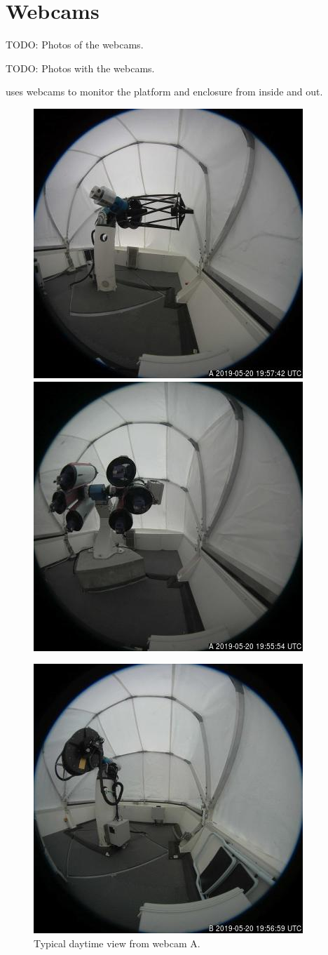 \chapter{Webcams}
\label{chapter:webcams}

TODO: Photos of the webcams.

TODO: Photos with the webcams.

{\projectname} uses webcams to monitor the platform and enclosure from inside and out.

\begin{figure}[t]
\begin{center}
\ifcoatli
\includegraphics[height=0.6\linewidth]{figures/coatli-webcam-a.jpg}
\fi
\ifddoti
\includegraphics[height=0.6\linewidth]{figures/ddoti-webcam-a.jpg}
\fi
\end{center}
\caption{Typical daytime view from {\projectname} webcam A.}
\label{figure:webcam-a-view}
\begin{center}
\ifcoatli
\includegraphics[height=0.6\linewidth]{figures/coatli-webcam-b.jpg}

\end{center}
\end{figure}
